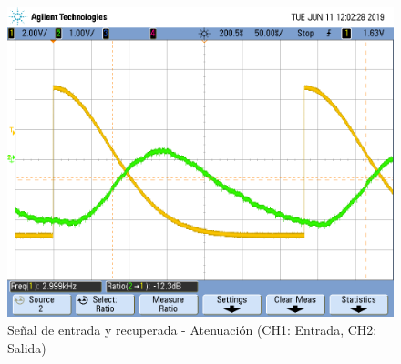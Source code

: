 \documentclass[assd_tp3_main.tex]{subfiles}
\begin{document}
\begin{figure}[!ht]
\begin{centering}
\includegraphics[scale=0.25]{../EJ4/Mediciones/0.5Gauss/s2_1a.png}
\par\end{centering}
\caption{Señal de entrada y recuperada - Atenuación (CH1: Entrada, CH2: Salida)}
\end{figure}
\end{document}
